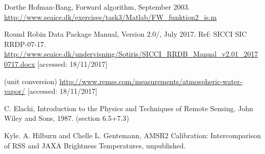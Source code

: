 \documentclass[11pt, a4paper]{article}
\begin{document}
\clearpage
\begin{thebibliography}{99}

	 Dorthe Hofman-Bang, Forward algorithm, September 2003. \newline \url{http://www.seaice.dk/exercises/task3/Matlab/FW_funktion2_is.m} \newline [accessed: 18/11/2017]
	
	
	 Round Robin Data Package Manual, Version 2.0/, July 2017. Ref: SICCI SIC RRDP-07-17. \newline
	\url{http://www.seaice.dk/undervisning/Sotiris/SICCI_RRDB_Manual_v2.01_20170717.docx} [accessed: 18/11/2017]
	
	 (unit conversion) \url{http://www.remss.com/measurements/atmospheric-water-vapor/} [accessed: 18/11/2017]
	
	  C. Elachi, Introduction to the Physics and Techniques of Remote Sensing. John Wiley and Sons, 1987. (section 6.5+7.3)

	 Kyle. A. Hilburn and Chelle L. Gentemann, AMSR2 Calibration: Intercomparison of RSS and JAXA Brightness Temperatures, unpublished.

	
\end{thebibliography}
\end{document}
